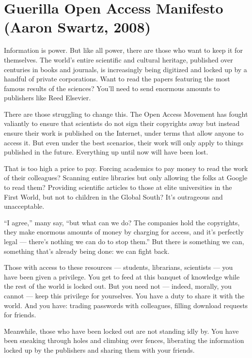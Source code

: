 \documentclass[letterpaper,12pt,english]{sphinxmanual}
\begin{document}

\chapter{Guerilla Open Access Manifesto  (Aaron Swartz, 2008)}
\label{2008:guerilla-open-access-manifesto-aaron-swartz-2008}\label{2008::doc}\label{2008:index-0}
Information is power. But like all power, there are those who want to keep it for themselves. The world's entire scientific and cultural heritage, published over centuries in books and journals, is increasingly being digitized and locked up by a handful of private corporations. Want to read the papers featuring the most famous results of the sciences? You'll need to send enormous amounts to publishers like Reed Elsevier.

There are those struggling to change this. The Open Access Movement has fought valiantly to ensure that scientists do not sign their copyrights away but instead ensure their work is published on the Internet, under terms that allow anyone to access it. But even under the best scenarios, their work will only apply to things published in the future. Everything up until now will have been lost.

That is too high a price to pay. Forcing academics to pay money to read the work of their colleagues? Scanning entire libraries but only allowing the folks at Google to read them? Providing scientific articles to those at elite universities in the First World, but not to children in the Global South? It's outrageous and unacceptable.

``I agree,'' many say, ``but what can we do? The companies hold the copyrights, they make enormous amounts of money by charging for access, and it's perfectly legal — there's nothing we can do to stop them.'' But there is something we can, something that's already being done: we can fight back.

Those with access to these resources — students, librarians, scientists — you have been given a privilege. You get to feed at this banquet of knowledge while the rest of the world is locked out. But you need not — indeed, morally, you cannot — keep this privilege for yourselves. You have a duty to share it with the world. And you have: trading passwords with colleagues, filling download requests for friends.

Meanwhile, those who have been locked out are not standing idly by. You have been sneaking through holes and climbing over fences, liberating the information locked up by the publishers and sharing them with your friends.
\end{document}
